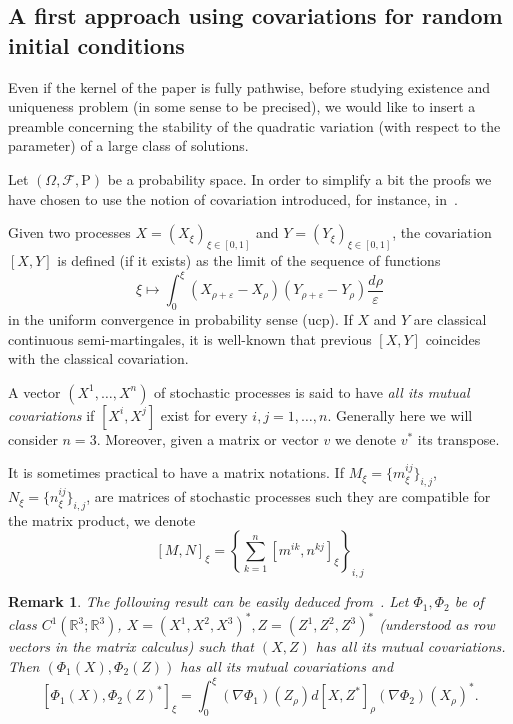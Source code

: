 \documentclass[a4paper,12pt,reqno]{amsart}
\newcommand{\R}{\mathbb{R}}
\newtheorem{remark}{Remark}
\begin{document}
\subsection{A first approach using covariations for random initial conditions}
\label{sec:quad-var}
Even if the kernel of the paper is fully pathwise,  
before studying existence and uniqueness problem (in some sense to be
precised),  we would like to insert a preamble
concerning the stability of  the quadratic variation (with respect to
the parameter) of a large class of solutions.

Let $(\Omega, {\mathcal F}, \mathrm{P})$ be a probability space.
In order to simplify a bit the proofs we have chosen to use the notion
of covariation introduced, for instance, in~\cite{rv95}.  

 Given two processes $X = (X_\xi)_{\xi \in [0,1]} $ and 
$Y = (Y_\xi)_{\xi \in [0,1]} $, the covariation  $[X,Y]$ is defined (if it exists) as the limit
of the sequence of functions 
$$ \xi \mapsto \int_0^\xi (X_{\rho+\varepsilon}-X_\rho) (Y_{\rho+\varepsilon}-Y_\rho)\frac{d\rho}{\varepsilon} $$
in the uniform convergence in probability sense (ucp).
If $X$ and $Y$ are classical continuous semi-martingales, 
 it is well-known that previous $[X,Y]$ coincides with the classical covariation.

 A vector $(X^1, \ldots, X^n)$ of stochastic processes
is said to have {\it all its mutual covariations} 
if $[X^i,X^j]$ exist for every $i,j = 1,\ldots, n$. 
Generally here we will consider $n = 3$. Moreover, given a matrix or vector $v$ 
we denote $v^*$ its transpose. 

It is sometimes practical to have a matrix notations.
If $M_\xi = \{m^{ij}_\xi\}_{i,j}$, 
$N_\xi = \{n^{ij}_\xi\}_{i,j}$, are matrices of stochastic
processes such they are compatible for the matrix
product, we denote
$$[M,N]_\xi = \left\{ \sum_{k=1}^n [m^{ik}, n^{kj}]_\xi\right\}_{i,j} $$ 


\begin{remark} \label{r1}
 The following result can be easily deduced
 from~\cite{rv95}.
Let $\Phi_1, \Phi_2$ be of class $C^1(\R^3; \R^3)$,
$X = (X^1, X^2, X^3)^*, Z= (Z^1,Z^2, Z^3)^* $
(understood as row vectors in the matrix calculus)
such that $(X,Z)$ has all its mutual covariations.
Then $(\Phi_1(X), \Phi_2(Z))$ has all its mutual covariations
and 
$$
[\Phi_1(X),\Phi_2(Z)^*]_\xi =  \int_0^\xi   (\nabla
\Phi_1)(Z_\rho) d[X,Z^*]_\rho (\nabla \Phi_2)(X_\rho)^*. 
$$
\end{remark}
\end{document}
